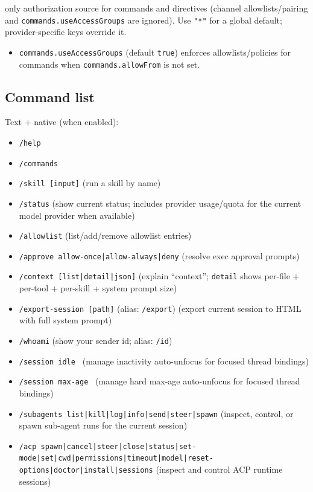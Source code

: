 only authorization source for commands and directives (channel allowlists/pairing and \texttt{commands.useAccessGroups}
are ignored). Use \texttt{"*"} for a global default; provider-specific keys override it.
\begin{itemize}
  \item \texttt{commands.useAccessGroups} (default \texttt{true}) enforces allowlists/policies for commands when \texttt{commands.allowFrom} is not set.
\end{itemize}


\subsection{Command list}


Text + native (when enabled):

\begin{itemize}
  \item \texttt{/help}
  \item \texttt{/commands}
  \item \texttt{/skill  [input]} (run a skill by name)
  \item \texttt{/status} (show current status; includes provider usage/quota for the current model provider when available)
  \item \texttt{/allowlist} (list/add/remove allowlist entries)
  \item \texttt{/approve  allow-once|allow-always|deny} (resolve exec approval prompts)
  \item \texttt{/context [list|detail|json]} (explain “context”; \texttt{detail} shows per-file + per-tool + per-skill + system prompt size)
  \item \texttt{/export-session [path]} (alias: \texttt{/export}) (export current session to HTML with full system prompt)
  \item \texttt{/whoami} (show your sender id; alias: \texttt{/id})
  \item \texttt{/session idle } (manage inactivity auto-unfocus for focused thread bindings)
  \item \texttt{/session max-age } (manage hard max-age auto-unfocus for focused thread bindings)
  \item \texttt{/subagents list|kill|log|info|send|steer|spawn} (inspect, control, or spawn sub-agent runs for the current session)
  \item \texttt{/acp spawn|cancel|steer|close|status|set-mode|set|cwd|permissions|timeout|model|reset-options|doctor|install|sessions} (inspect and control ACP runtime sessions)

\end{itemize}
